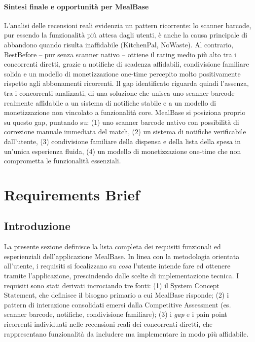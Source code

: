 \documentclass[11pt,a4paper]{article}
\begin{document}
\paragraph{Sintesi finale e opportunità per MealBase}
L'analisi delle recensioni reali evidenzia un pattern ricorrente: lo scanner barcode, pur essendo la funzionalità più attesa dagli utenti, è anche la causa principale di abbandono quando risulta inaffidabile (KitchenPal, NoWaste). Al contrario, BestBefore -- pur senza scanner nativo -- ottiene il rating medio più alto tra i concorrenti diretti, grazie a notifiche di scadenza affidabili, condivisione familiare solida e un modello di monetizzazione one-time percepito molto positivamente rispetto agli abbonamenti ricorrenti.
\newline
Il gap identificato riguarda quindi l'assenza, tra i concorrenti analizzati, di una soluzione che unisca uno scanner barcode realmente affidabile a un sistema di notifiche stabile e a un modello di monetizzazione non vincolato a funzionalità core. MealBase si posiziona proprio su questo gap, puntando su: (1) uno scanner barcode nativo con possibilità di correzione manuale immediata del match, (2) un sistema di notifiche verificabile dall'utente, (3) condivisione familiare della dispensa e della lista della spesa in un'unica esperienza fluida, (4) un modello di monetizzazione one-time che non comprometta le funzionalità essenziali.

\section{Requirements Brief}
\label{sec:requirements}

\subsection{Introduzione}
La presente sezione definisce la lista completa dei requisiti funzionali ed esperienziali dell'applicazione MealBase. In linea con la metodologia orientata all'utente, i requisiti si focalizzano su \textit{cosa} l'utente intende fare ed ottenere tramite l'applicazione, prescindendo dalle scelte di implementazione tecnica.
\newline
I requisiti sono stati derivati incrociando tre fonti: (1) il System Concept Statement, che definisce il bisogno primario a cui MealBase risponde; (2) i pattern di interazione consolidati emersi dalla Competitive Assessment (es. scanner barcode, notifiche, condivisione familiare); (3) i \textit{gap} e i pain point ricorrenti individuati nelle recensioni reali dei concorrenti diretti, che rappresentano funzionalità da includere ma implementare in modo più affidabile.
\end{document}

